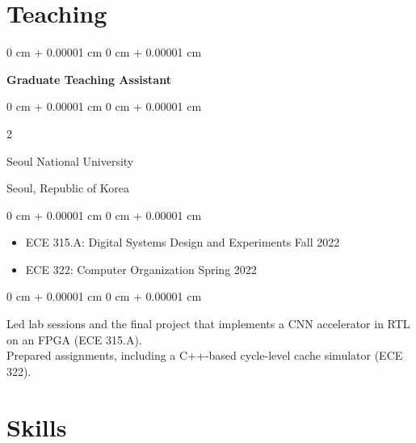 \documentclass[10pt, letterpaper]{article}
\newenvironment{highlights}{
  \begin{itemize}[
    topsep=0.10 cm,
    parsep=0.10 cm,
    partopsep=0pt,
    itemsep=0.12 cm,
    leftmargin=0 cm + 10pt
  ]
}{
  \end{itemize}
} %
\newenvironment{highlightsforbulletentries}{
  \begin{itemize}[
    topsep=0.10 cm,
    parsep=0.10 cm,
    partopsep=0pt,
    itemsep=0pt,
    leftmargin=10pt
  ]
}{
  \end{itemize}
} %
\newenvironment{onecolentry}{
  \begin{adjustwidth}{
    0 cm + 0.00001 cm
  }{
    0 cm + 0.00001 cm
  }
}{
  \end{adjustwidth}
} %
\newenvironment{twocolentry}[2][]{
  \onecolentry
  \def\secondColumn{#2}
  \setcolumnwidth{\fill, 6 cm}
  \begin{paracol}{2}
}{
  \switchcolumn \raggedleft \secondColumn
  \end{paracol}
  \endonecolentry
} %
\begin{document}
%
%
%

  \section{Teaching}
    \begin{onecolentry}
      \textbf{Graduate Teaching Assistant}
    \end{onecolentry}
%
    \begin{twocolentry}{
      Seoul, Republic of Korea
    }
      Seoul National University
    \end{twocolentry}
    \vspace{0.1cm}
    \begin{onecolentry}
      \begin{highlightsforbulletentries}
        \item ECE 315.A: Digital Systems Design and Experiments \hfill Fall 2022
        \item ECE 322: Computer Organization \hfill Spring 2022
      \end{highlightsforbulletentries}
    \end{onecolentry}
    \vspace{0.1cm}
    \begin{onecolentry}
      Led lab sessions and the final project that implements a CNN accelerator in RTL on an FPGA (ECE 315.A). \\
      Prepared assignments, including a C++-based cycle-level cache simulator (ECE 322).
    \end{onecolentry}
  
  \section{Skills}
    
\end{document}
